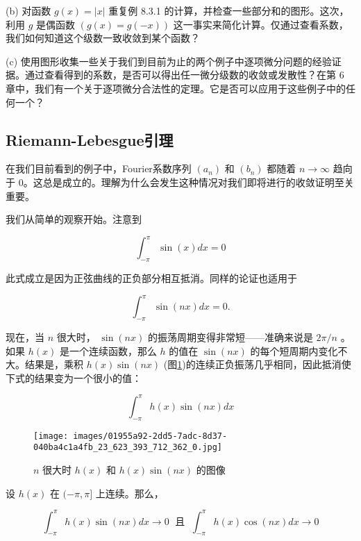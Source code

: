 (b) 对函数 \(g\left( x\right)  = \left| x\right|\) 重复例 8.3.1 的计算，并检查一些部分和的图形。这次，利用 \(g\) 是偶函数 \(\left( {g\left( x\right)  = g\left( {-x}\right) }\right)\) 这一事实来简化计算。仅通过查看系数，我们如何知道这个级数一致收敛到某个函数？

(c) 使用图形收集一些关于我们到目前为止的两个例子中逐项微分问题的经验证据。通过查看得到的系数，是否可以得出任一微分级数的收敛或发散性？在第 6 章中，我们有一个关于逐项微分合法性的定理。它是否可以应用于这些例子中的任何一个？



\subsection{Riemann-Lebesgue引理}

在我们目前看到的例子中，Fourier系数序列 \(\left( {a}_{n}\right)\) 和 \(\left( {b}_{n}\right)\) 都随着 \(n \rightarrow  \infty\) 趋向于 $0$。这总是成立的。理解为什么会发生这种情况对我们即将进行的收敛证明至关重要。

我们从简单的观察开始。注意到

\[
{\int }_{-\pi }^{\pi }\sin \left( x\right) {dx} = 0
\]

此式成立是因为正弦曲线的正负部分相互抵消。同样的论证也适用于

\[
{\int }_{-\pi }^{\pi }\sin \left( {nx}\right) {dx} = 0.
\]

现在，当 \(n\) 很大时， \(\sin \left( {nx}\right)\) 的振荡周期变得非常短——准确来说是 \({2\pi }/n\) 。如果 \(h\left( x\right)\) 是一个连续函数，那么 \(h\) 的值在 \(\sin \left( {nx}\right)\) 的每个短周期内变化不大。结果是，乘积 \(h\left( x\right) \sin \left( {nx}\right)\) (图\ref{fig:8.3})的连续正负振荡几乎相同，因此抵消使下式的结果变为一个很小的值：

\[
{\int }_{-\pi }^{\pi }h\left( x\right) \sin \left( {nx}\right) {dx}
\]

\begin{figure}[htbp]
  \centering
  \texttt{[image: images/01955a92-2dd5-7adc-8d37-040ba4c1a4fb\_23\_623\_393\_712\_362\_0.jpg]}
  \caption{\(n\) 很大时 \(h\left( x\right)\) 和 \(h\left( x\right) \sin \left( {nx}\right)\) 的图像 }
  \label{fig:8.3}
\end{figure}


\begin{Thm}
  \label{thm:8.3.2}
  设 \(h\left( x\right)\) 在 \(( - \pi ,\pi \rbrack\) 上连续。那么，

\[
{\int }_{-\pi }^{\pi }h\left( x\right) \sin \left( {nx}\right) {dx} \rightarrow  0\;\text{ 且 }\;{\int }_{-\pi }^{\pi }h\left( x\right) \cos \left( {nx}\right) {dx} \rightarrow  0
\]
\end{Thm}

